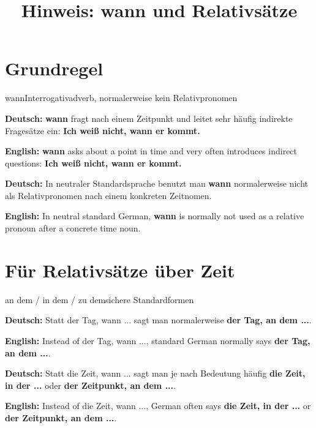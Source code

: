 \documentclass[a4paper,11pt]{article}
\title{Hinweis: \glqq wann\grqq{} und Relativsätze}
\date{}
\newcommand{\GermanText}[1]{\textbf{Deutsch: }#1\par}
\newcommand{\EnglishText}[1]{{\small\color{SoftGray}\textbf{English: }#1\par}}
\begin{document}
\maketitle

\tableofcontents

\newpage

\section{Grundregel}

\begin{grammarentry}{wann}{Interrogativadverb, normalerweise kein Relativpronomen}

\GermanText{\textbf{wann} fragt nach einem Zeitpunkt und leitet sehr häufig indirekte Fragesätze ein: \textbf{Ich weiß nicht, wann er kommt.}}

\EnglishText{\textbf{wann} asks about a point in time and very often introduces indirect questions: \textbf{Ich weiß nicht, wann er kommt.}}

\GermanText{In neutraler Standardsprache benutzt man \textbf{wann} normalerweise nicht als Relativpronomen nach einem konkreten Zeitnomen.}

\EnglishText{In neutral standard German, \textbf{wann} is normally not used as a relative pronoun after a concrete time noun.}

\end{grammarentry}

\section{Für Relativsätze über Zeit}

\begin{grammarentry}{an dem / in dem / zu dem}{sichere Standardformen}

\GermanText{Statt \glqq der Tag, wann ...\grqq{} sagt man normalerweise \textbf{der Tag, an dem ...}.}

\EnglishText{Instead of \glqq der Tag, wann ...\grqq{}, standard German normally says \textbf{der Tag, an dem ...}.}

\GermanText{Statt \glqq die Zeit, wann ...\grqq{} sagt man je nach Bedeutung häufig \textbf{die Zeit, in der ...} oder \textbf{der Zeitpunkt, an dem ...}.}

\EnglishText{Instead of \glqq die Zeit, wann ...\grqq{}, German often says \textbf{die Zeit, in der ...} or \textbf{der Zeitpunkt, an dem ...}.}

\end{grammarentry}
\end{document}
